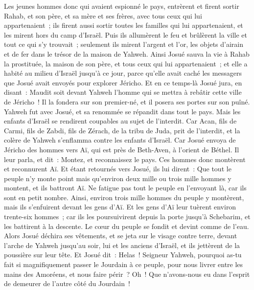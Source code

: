 \begin{multicols}{2}
Les jeunes hommes donc qui avaient espionné le pays, entrèrent et firent sortir Rahab, et son père, et sa mère et ses frères, avec tous ceux qui lui appartenaient~; ils firent aussi sortir toutes les familles qui lui appartenaient, et les mirent hors du camp d'Israël.
Puis ils allumèrent le feu et brûlèrent la ville et tout ce qui s'y trouvait~; seulement ils mirent l'argent et l'or, les objets d'airain et de fer dans le trésor de la maison de Yahweh.
Ainsi Josué sauva la vie à Rahab la prostituée, la maison de son père, et tous ceux qui lui appartenaient~; et elle a habité au milieu d'Israël jusqu'à ce jour, parce qu'elle avait caché les messagers que Josué avait envoyés pour explorer Jéricho.
Et en ce temps-là Josué jura, en disant~: Maudit soit devant Yahweh l'homme qui se mettra à rebâtir cette ville de Jéricho~! Il la fondera sur son premier-né, et il posera ses portes sur son puîné.
Yahweh fut avec Josué, et sa renommée se répandit dans tout le pays.
\VerseOne{}Mais les enfants d'Israël se rendirent coupables au sujet de l'interdit. Car Acan, fils de Carmi, fils de Zabdi, fils de Zérach, de la tribu de Juda, prit de l'interdit, et la colère de Yahweh s'enflamma contre les enfants d'Israël.
Car Josué envoya de Jéricho des hommes vers Aï, qui est près de Beth-Aven, à l'orient de Béthel. Il leur parla, et dit~: Montez, et reconnaissez le pays. Ces hommes donc montèrent et reconnurent Aï.
Et étant retournés vers Josué, ils lui dirent~: Que tout le peuple n'y monte point mais qu'environ deux mille ou trois mille hommes y montent, et ils battront Aï. Ne fatigue pas tout le peuple en l'envoyant là, car ils sont en petit nombre.
Ainsi, environ trois mille hommes du peuple y montèrent, mais ils s'enfuirent devant les gens d'Aï.
Et les gens d'Aï leur tuèrent environ trente-six hommes~; car ils les poursuivirent depuis la porte jusqu'à Schebarim, et les battirent à la descente. Le cœur du peuple se fondit et devint comme de l'eau.
Alors Josué déchira ses vêtements, et se jeta sur le visage contre terre, devant l'arche de Yahweh jusqu'au soir, lui et les anciens d'Israël, et ils jettèrent de la poussière sur leur tête.
Et Josué dit~: Helas~! Seigneur Yahweh, pourquoi as-tu fait si magnifiquement passer le Jourdain à ce peuple, pour nous livrer entre les mains des Amoréens, et nous faire périr~? Oh~! Que n'avons-nous eu dans l'esprit de demeurer de l'autre côté du Jourdain~!

\end{multicols}

